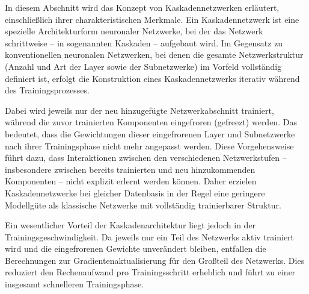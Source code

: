 In diesem Abschnitt wird das Konzept von Kaskadennetzwerken erläutert, einschließlich ihrer charakteristischen Merkmale. Ein Kaskadennetzwerk ist 
eine spezielle Architekturform neuronaler Netzwerke, bei der das Netzwerk schrittweise – in sogenannten Kaskaden – aufgebaut wird. Im Gegensatz zu 
konventionellen neuronalen Netzwerken, bei denen die gesamte Netzwerkstruktur (Anzahl und Art der Layer sowie der Subnetzwerke) im Vorfeld 
vollständig definiert ist, erfolgt die Konstruktion eines Kaskadennetzwerks iterativ während des Trainingsprozesses.

Dabei wird jeweils nur der neu hinzugefügte Netzwerkabschnitt trainiert, während die zuvor trainierten Komponenten eingefroren (gefreezt) werden. 
Das bedeutet, dass die Gewichtungen dieser eingefrorenen Layer und Subnetzwerke nach ihrer Trainingsphase nicht mehr angepasst werden. Diese 
Vorgehensweise führt dazu, dass Interaktionen zwischen den verschiedenen Netzwerkstufen – insbesondere zwischen bereits trainierten und neu 
hinzukommenden Komponenten – nicht explizit erlernt werden können. Daher erzielen Kaskadennetzwerke bei gleicher Datenbasis in der Regel eine 
geringere Modellgüte als klassische Netzwerke mit vollständig trainierbarer Struktur.

Ein wesentlicher Vorteil der Kaskadenarchitektur liegt jedoch in der Trainingsgeschwindigkeit. Da jeweils nur ein Teil des Netzwerks aktiv 
trainiert wird und die eingefrorenen Gewichte unverändert bleiben, entfallen die Berechnungen zur Gradientenaktualisierung für den Großteil des 
Netzwerks. Dies reduziert den Rechenaufwand pro Trainingsschritt erheblich und führt zu einer insgesamt schnelleren Trainingsphase.
